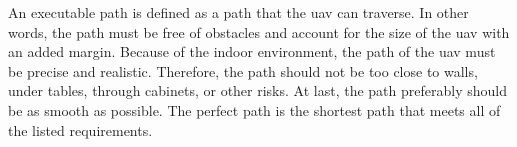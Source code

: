 An executable path is defined as a path that the \acs{uav} can traverse. In other words, the path must be free of obstacles and account for the size of the \acs{uav} with an added margin. Because of the indoor environment, the path of the \acs{uav} must be precise and realistic. Therefore, the path should not be too close to walls, under tables, through cabinets, or other risks. At last, the path preferably should be as smooth as possible. The perfect path is the shortest path that meets all of the listed requirements.